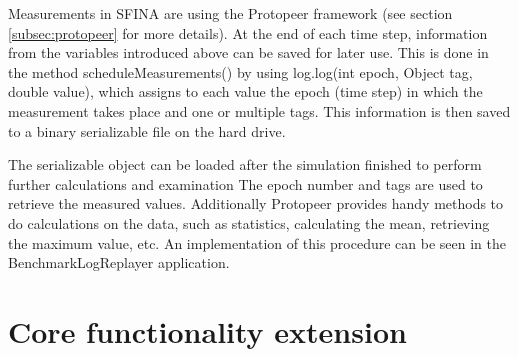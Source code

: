 \documentclass[11pt,fleqn]{book} %
\begin{document}
Measurements in SFINA are using the Protopeer framework (see section \ref{subsec:protopeer} for more details). At the end of each time step, information from the variables introduced above can be saved for later use. This is done in the method scheduleMeasurements() by using log.log(int epoch, Object tag, double value), which assigns to each value the epoch (time step) in which the measurement takes place and one or multiple tags. This information is then saved to a binary serializable file on the hard drive. 

The serializable object can be loaded after the simulation finished to perform further calculations and examination The epoch number and tags are used to retrieve the measured values. Additionally Protopeer provides handy methods to do calculations on the data, such as statistics, calculating the mean, retrieving the maximum value, etc. An implementation of this procedure can be seen in the BenchmarkLogReplayer application.


\chapter{Core functionality extension}
\end{document}
